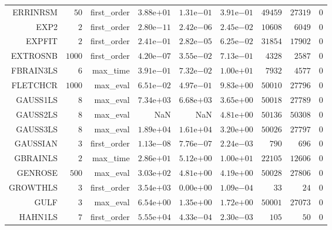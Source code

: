 \begin{longtable}{rrrrrrrrr}
ERRINRSM & \(    50\) & first\_order & \( 3.88\)e\(+01\) & \( 1.31\)e\(-01\) & \( 3.91\)e\(-01\) & \( 49459\) & \( 27319\) & \(     0\) \\
EXP2 & \(     2\) & first\_order & \( 2.80\)e\(-11\) & \( 2.42\)e\(-06\) & \( 2.45\)e\(-02\) & \( 10608\) & \(  6049\) & \(     0\) \\
EXPFIT & \(     2\) & first\_order & \( 2.41\)e\(-01\) & \( 2.82\)e\(-05\) & \( 6.25\)e\(-02\) & \( 31854\) & \( 17902\) & \(     0\) \\
EXTROSNB & \(  1000\) & first\_order & \( 4.20\)e\(-07\) & \( 3.55\)e\(-02\) & \( 7.13\)e\(-01\) & \(  4328\) & \(  2587\) & \(     0\) \\
FBRAIN3LS & \(     6\) & max\_time & \( 3.91\)e\(-01\) & \( 7.32\)e\(-02\) & \( 1.00\)e\(+01\) & \(  7932\) & \(  4577\) & \(     0\) \\
FLETCHCR & \(  1000\) & max\_eval & \( 6.51\)e\(-02\) & \( 4.97\)e\(-01\) & \( 9.83\)e\(+00\) & \( 50010\) & \( 27796\) & \(     0\) \\
GAUSS1LS & \(     8\) & max\_eval & \( 7.34\)e\(+03\) & \( 6.68\)e\(+03\) & \( 3.65\)e\(+00\) & \( 50018\) & \( 27789\) & \(     0\) \\
GAUSS2LS & \(     8\) & max\_eval &       NaN &       NaN & \( 4.81\)e\(+00\) & \( 50136\) & \( 50308\) & \(     0\) \\
GAUSS3LS & \(     8\) & max\_eval & \( 1.89\)e\(+04\) & \( 1.61\)e\(+04\) & \( 3.20\)e\(+00\) & \( 50026\) & \( 27797\) & \(     0\) \\
GAUSSIAN & \(     3\) & first\_order & \( 1.13\)e\(-08\) & \( 7.76\)e\(-07\) & \( 2.24\)e\(-03\) & \(   790\) & \(   696\) & \(     0\) \\
GBRAINLS & \(     2\) & max\_time & \( 2.86\)e\(+01\) & \( 5.12\)e\(+00\) & \( 1.00\)e\(+01\) & \( 22105\) & \( 12606\) & \(     0\) \\
GENROSE & \(   500\) & max\_eval & \( 3.03\)e\(+02\) & \( 4.81\)e\(+00\) & \( 4.19\)e\(+00\) & \( 50028\) & \( 27806\) & \(     0\) \\
GROWTHLS & \(     3\) & first\_order & \( 3.54\)e\(+03\) & \( 0.00\)e\(+00\) & \( 1.09\)e\(-04\) & \(    33\) & \(    24\) & \(     0\) \\
GULF & \(     3\) & max\_eval & \( 6.54\)e\(+00\) & \( 1.35\)e\(+00\) & \( 1.72\)e\(+00\) & \( 50001\) & \( 27073\) & \(     0\) \\
HAHN1LS & \(     7\) & first\_order & \( 5.55\)e\(+04\) & \( 4.33\)e\(-04\) & \( 2.30\)e\(-03\) & \(   105\) & \(    50\) & \(     0\) \\

\end{longtable}
